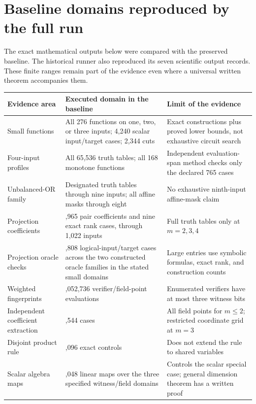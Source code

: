 \documentclass[11pt,letterpaper,oneside]{report}
\theoremstyle{komorebi}
\begin{document}
\section{Baseline domains reproduced by the full run}
The exact mathematical outputs below were compared with the preserved baseline. The historical runner also reproduced its seven scientific output records. These finite ranges remain part of the evidence even where a universal written theorem accompanies them.
\small
\begin{longtable}{@{}>{\RaggedRight\arraybackslash}p{1.57in}>{\RaggedRight\arraybackslash}p{2.27in}>{\RaggedRight\arraybackslash}p{2.00in}@{}}
\toprule
\textbf{Evidence area} & \textbf{Executed domain in the baseline} & \textbf{Limit of the evidence}\\\midrule\endhead
Small functions & All 276 functions on one, two, or three inputs; 4,240 scalar input/target cases; 2,344 cuts & Exact constructions plus proved lower bounds, not exhaustive circuit search\\
Four-input profiles & All 65,536 truth tables; all 168 monotone functions & Independent evaluation-span method checks only the declared 765 cases\\
Unbalanced-OR family & Designated truth tables through nine inputs; all affine masks through eight & No exhaustive ninth-input affine-mask claim\\
Projection coefficients & 693,965 pair coefficients and nine exact rank cases, through 1,022 inputs & Full truth tables only at $m=2,3,4$\\
Projection oracle checks & 65,808 logical-input/target cases across the two constructed oracle families in the stated small domains & Large entries use symbolic formulas, exact rank, and construction counts\\
Weighted fingerprints & 1,052,736 verifier/field-point evaluations & Enumerated verifiers have at most three witness bits\\
Independent coefficient extraction & 20,544 cases & All field points for $m\le2$; restricted coordinate grid at $m=3$\\
Disjoint product rule & 4,096 exact controls & Does not extend the rule to shared variables\\
Scalar algebra maps & 66,048 linear maps over the three specified witness/field domains & Controls the scalar special case; general dimension theorem has a written proof\\
\bottomrule
\end{longtable}
\normalsize
\end{document}
